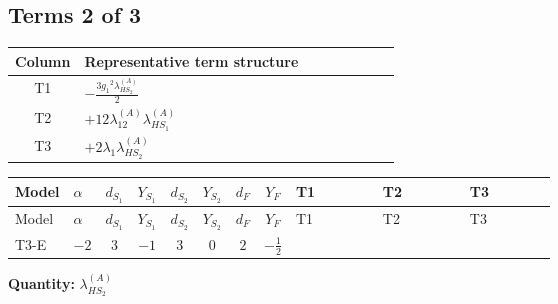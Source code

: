 \documentclass[8pt]{article}
\begin{document}
\begin{landscape}
\subsection*{Terms 2 of 3}
\begin{center}
\begin{tabular}{@{}c >{\raggedright\arraybackslash}p{0.82\linewidth}@{}}
\toprule
Column & Representative term structure \\
\midrule
T1 & \(\displaystyle -\frac{3 {g_1}^2 {\lambda_{HS_2}^{(A)}}}{2}\) \\
\midrule
T2 & \(\displaystyle +12 {\lambda_{12}^{(A)}} {\lambda_{HS_1}^{(A)}}\) \\
\midrule
T3 & \(\displaystyle +2 {\lambda_1} {\lambda_{HS_2}^{(A)}}\) \\
\midrule
\bottomrule
\end{tabular}
\end{center}
\smallskip
\tiny
\begin{longtable}{@{}llcccccc >{\raggedright\arraybackslash}p{0.21\linewidth} >{\raggedright\arraybackslash}p{0.21\linewidth} >{\raggedright\arraybackslash}p{0.21\linewidth}@{}}
\toprule
Model & $\alpha$ & $d_{S_1}$ & $Y_{S_1}$ & $d_{S_2}$ & $Y_{S_2}$ & $d_F$ & $Y_F$ & T1 & T2 & T3 \\
\midrule
\endfirsthead
\toprule
Model & $\alpha$ & $d_{S_1}$ & $Y_{S_1}$ & $d_{S_2}$ & $Y_{S_2}$ & $d_F$ & $Y_F$ & T1 & T2 & T3 \\
\midrule
\endhead
T3-E & $-2$ & $3$ & $-1$ & $3$ & $0$ & $2$ & $-\frac{1}{2}$ & \scriptsize\adjustbox{max width=\linewidth}{$\begin{gathered} -\frac{3 {g_1}^2 {\lambda_{HS_2}^{(A)}}}{2}\end{gathered}$} & \scriptsize\adjustbox{max width=\linewidth}{$\begin{gathered} +12 {\lambda_{12}^{(A)}} {\lambda_{HS_1}^{(A)}}\end{gathered}$} & \scriptsize\adjustbox{max width=\linewidth}{$\begin{gathered} +2 {\lambda_1} {\lambda_{HS_2}^{(A)}}\end{gathered}$} \\
\midrule
\bottomrule
\end{longtable}
\clearpage
\noindent\textbf{Quantity: }$\lambda_{HS_2}^{(A)}$\par\smallskip

\end{landscape}
\end{document}
